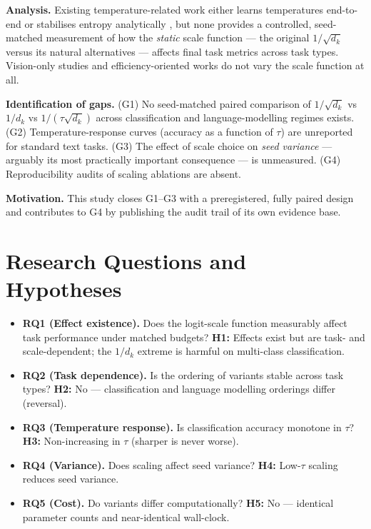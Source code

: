 \documentclass[11pt,a4paper]{article}
\begin{document}
\textbf{Analysis.} Existing temperature-related work either learns temperatures end-to-end \cite{lin2018,zhang2022} or stabilises entropy analytically \cite{zhai2023,hong2025}, but none provides a controlled, seed-matched measurement of how the \emph{static} scale function --- the original $1/\sqrt{d_k}$ versus its natural alternatives --- affects final task metrics across task types. Vision-only studies \cite{dosovitskiy2021} and efficiency-oriented works \cite{dao2022} do not vary the scale function at all.

\textbf{Identification of gaps.} (G1) No seed-matched paired comparison of $1/\sqrt{d_k}$ vs $1/d_k$ vs $1/(\tau\sqrt{d_k})$ across classification and language-modelling regimes exists. (G2) Temperature-response curves (accuracy as a function of $\tau$) are unreported for standard text tasks. (G3) The effect of scale choice on \emph{seed variance} --- arguably its most practically important consequence --- is unmeasured. (G4) Reproducibility audits of scaling ablations are absent.

\textbf{Motivation.} This study closes G1--G3 with a preregistered, fully paired design and contributes to G4 by publishing the audit trail of its own evidence base.

\section{Research Questions and Hypotheses}

\begin{itemize}[leftmargin=*,itemsep=2pt]
\item \textbf{RQ1 (Effect existence).} Does the logit-scale function measurably affect task performance under matched budgets? \textbf{H1:} Effects exist but are task- and scale-dependent; the $1/d_k$ extreme is harmful on multi-class classification.
\item \textbf{RQ2 (Task dependence).} Is the ordering of variants stable across task types? \textbf{H2:} No --- classification and language modelling orderings differ (reversal).
\item \textbf{RQ3 (Temperature response).} Is classification accuracy monotone in $\tau$? \textbf{H3:} Non-increasing in $\tau$ (sharper is never worse).
\item \textbf{RQ4 (Variance).} Does scaling affect seed variance? \textbf{H4:} Low-$\tau$ scaling reduces seed variance.
\item \textbf{RQ5 (Cost).} Do variants differ computationally? \textbf{H5:} No --- identical parameter counts and near-identical wall-clock.
\end{itemize}
\end{document}
